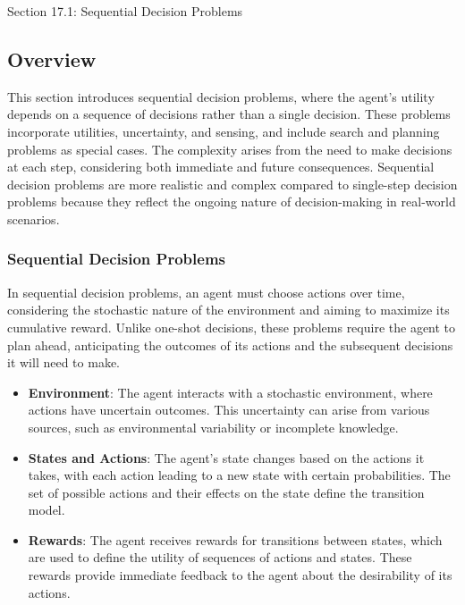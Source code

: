 \begin{notes}{Section 17.1: Sequential Decision Problems}
    \subsection*{Overview}

    This section introduces sequential decision problems, where the agent's utility depends on a sequence of decisions rather than a single decision. These problems incorporate utilities, uncertainty, 
    and sensing, and include search and planning problems as special cases. The complexity arises from the need to make decisions at each step, considering both immediate and future consequences. 
    Sequential decision problems are more realistic and complex compared to single-step decision problems because they reflect the ongoing nature of decision-making in real-world scenarios.
    
    \subsubsection*{Sequential Decision Problems}
    
    In sequential decision problems, an agent must choose actions over time, considering the stochastic nature of the environment and aiming to maximize its cumulative reward. Unlike one-shot decisions, 
    these problems require the agent to plan ahead, anticipating the outcomes of its actions and the subsequent decisions it will need to make.
    
    \begin{highlight}
    
        \begin{itemize}
            \item \textbf{Environment}: The agent interacts with a stochastic environment, where actions have uncertain outcomes. This uncertainty can arise from various sources, such as environmental 
            variability or incomplete knowledge.
            \item \textbf{States and Actions}: The agent's state changes based on the actions it takes, with each action leading to a new state with certain probabilities. The set of possible actions and 
            their effects on the state define the transition model.
            \item \textbf{Rewards}: The agent receives rewards for transitions between states, which are used to define the utility of sequences of actions and states. These rewards provide immediate feedback 
            to the agent about the desirability of its actions.
        \end{itemize}
    

\end{highlight}
\end{notes}
